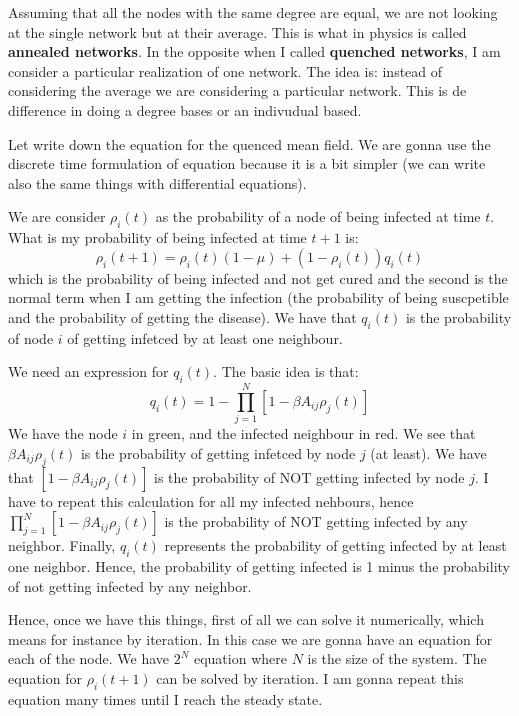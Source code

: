 \documentclass[../main/main.tex]{subfiles}
\begin{document}
Assuming that all the nodes with the same degree are equal, we are not looking at the single network but at their average. This is what in physics is called \textbf{annealed networks}.
In the opposite when I called \textbf{quenched networks}, I am consider a particular realization of one network. The idea is: instead of considering the average we are considering a particular network. This is de difference in doing a degree bases or an indivudual based.

Let write down the equation for the quenced mean field. We are gonna use the discrete time formulation of equation because it is a bit simpler (we can write also the same things with differential equations).

We are consider \( \rho _i (t) \) as the probability of a node of being infected at time \( t \). What is my probability of being infected at time \( t+1 \) is:
\begin{equation*}
  \rho _i (t+1) = \rho _i(t) (1- \mu ) + (1 - \rho _i(t))q_i(t)
\end{equation*}
which is the probability of being infected and not get cured and the second is the normal term when I am getting the infection (the probability of being suscpetible and the probability of getting the disease).
We have that \( q_i(t) \) is the probability of node \( i \) of getting infetced by at least one neighbour.

We need an expression for \( q_i(t) \). The basic idea is that:
\begin{equation*}
  q_i (t) = 1 - \prod_{j=1}^{N} [1- \beta A_{ij} \rho _j (t)]
\end{equation*}
We have the node \( i \) in green, and the infected neighbour in red. We see that \( \beta A_{ij} \rho _j (t) \) is the probability of getting infetced by node \( j \) (at least). We have that  \( [1- \beta A_{ij} \rho _j (t)] \) is the probability of NOT getting infected by node \( j \). I have to repeat this calculation for all my infected nehbours, hence \( \prod_{j=1}^{N} [1- \beta A_{ij} \rho _j (t)] \) is the probability of NOT getting infected by any neighbor.
Finally, \(   q_i (t) \) represents the probability of getting infected by at least one neighbor.
Hence, the probability of getting infected is 1 minus the probability of not getting infected by any neighbor.

Hence, once we have this things, first of all we can solve it numerically, which means for instance by iteration. In this case we are gonna have an equation for each of the node. We have \( 2^N \) equation where \( N \) is the size of the system. The equation for \( \rho _i (t+1) \) can be solved by iteration. I am gonna repeat this equation many times until I reach the steady state.
\end{document}
